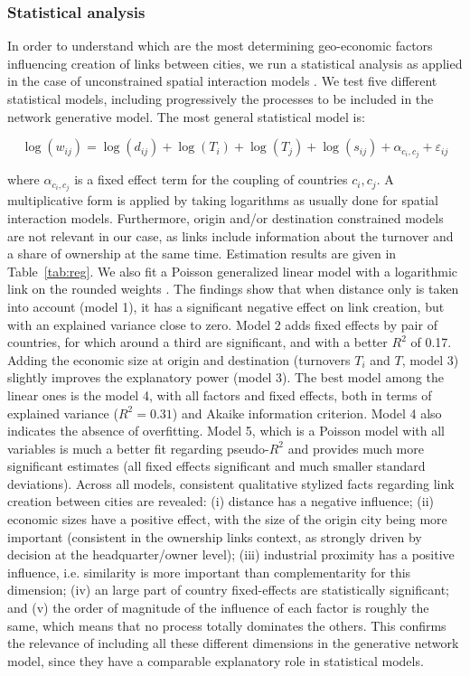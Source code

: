 \documentclass[10pt,letterpaper]{article}
\begin{document}
\subsubsection*{Statistical analysis}

In order to understand which are the most determining geo-economic factors influencing creation of links between cities, we run a statistical analysis as applied in the case of unconstrained spatial interaction models \cite{wilson1975some}. We test five different statistical models, including progressively the processes to be included in the network generative model. The most general statistical model is:

\begin{equation}
\log(w_{ij}) = \log(d_{ij}) + \log(T_i) + \log(T_j) + \log(s_{ij}) + \alpha_{c_i,c_j} + \varepsilon_{ij}
\end{equation}

where $\alpha_{c_i,c_j}$ is a fixed effect term for the coupling of countries $c_i,c_j$. A multiplicative form is applied by taking logarithms as usually done for spatial interaction models. Furthermore, origin and/or destination constrained models are not relevant in our case, as links include information about the turnover and a share of ownership at the same time. Estimation results are given in Table~\ref{tab:reg}. We also fit a Poisson generalized linear model with a logarithmic link on the rounded weights \cite{flowerdew1988fitting}. The findings show that when distance only is taken into account (model 1), it has a significant negative effect on link creation, but with an explained variance close to zero. Model 2 adds fixed effects by pair of countries, for which around a third are significant, and with a better $R^2$ of 0.17. Adding the economic size at origin and destination (turnovers $T_i$ and $T$, model 3) slightly improves the explanatory power (model 3). The best model among the linear ones is the model 4, with all factors and fixed effects, both in terms of explained variance ($R^2 = 0.31$) and Akaike information criterion. Model 4 also indicates the absence of overfitting. Model 5, which is a Poisson model with all variables is much a better fit regarding pseudo-$R^2$ and provides much more significant estimates (all fixed effects significant and much smaller standard deviations). Across all models, consistent qualitative stylized facts regarding link creation between cities are revealed: (i) distance has a negative influence; (ii) economic sizes have a positive effect, with the size of the origin city being more important (consistent in the ownership links context, as strongly driven by decision at the headquarter/owner level); (iii) industrial proximity has a positive influence, i.e. similarity is more important than complementarity for this dimension; (iv) an large part of country fixed-effects are statistically significant; and (v) the order of magnitude of the influence of each factor is roughly the same, which means that no process totally dominates the others.
This confirms the relevance of including all these different dimensions in the generative network model, since they have a comparable explanatory role in statistical models.
\end{document}
